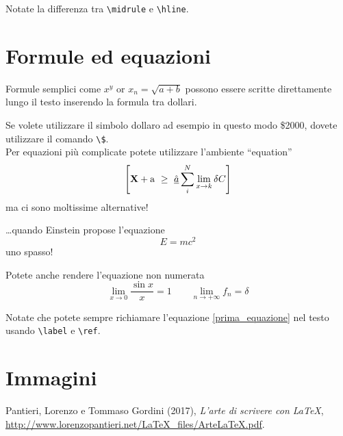 \documentclass[a4paper,11pt]{article}
\begin{document}
Notate la differenza tra \verb!\midrule! e \verb!\hline!.




\section{Formule ed equazioni}

Formule semplici come $x^y$ or $x_n = \sqrt{a + b}$ possono essere scritte direttamente lungo il testo inserendo la formula tra dollari.

Se volete utilizzare il simbolo dollaro ad esempio in questo modo \$2000,
dovete utilizzare il comando \verb+\$+.
\\

Per equazioni più complicate potete utilizzare l'ambiente  ``equation'' 
\begin{equation}
\label{prima_equazione}
\left[
{\bf X} + {\rm a} \ \geq\ 
\underline{\hat a} \sum_i^N \lim_{x \rightarrow k} \delta C
\right]
\end{equation}
ma ci sono moltissime alternative!

\dots quando Einstein propose l’equazione
\begin{equation}
\label{eqEinstein}
E = mc^2
\end{equation}
uno spasso!

Potete anche rendere l'equazione non numerata
\begin{equation}
    \lim_{x\to 0} \frac{\sin x}{x}=1 \qquad 
    \lim_{n\to +\infty}f_n=\delta
\nonumber %
\end{equation}

Notate che potete sempre richiamare l'equazione \ref{prima_equazione} nel testo usando \verb!\label! e \verb!\ref!. 


\section{Immagini}


\begin{thebibliography}{9}
Pantieri, Lorenzo e Tommaso Gordini (2017),
\emph{L’arte di scrivere con \LaTeX},
\url{http://www.lorenzopantieri.net/LaTeX_files/ArteLaTeX.pdf}.
\end{thebibliography}
\end{document}
